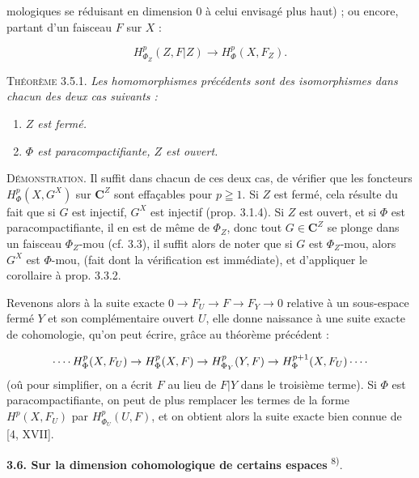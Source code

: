 
\noindent mologiques se réduisant en dimension 0 à celui envisagé plus haut) ;
ou encore, partant d'un faisceau $F$ sur $X$ :

\[
H^p_{\Phi_Z}(Z,F\vert Z)\to H^p_\Phi(X,F_Z).
\]

\indent\textsc{Théorème 3.5.1.} \textit{Les homomorphismes précédents
sont des isomorphismes dans chacun des deux cas suivants :}
\begin{enumerate}
\item \textit{$Z$ est fermé.}
\item \textit{$\Phi$ est paracompactifiante, $Z$ est ouvert.}
\end{enumerate}

\indent\textsc{Démonstration.} Il suffit dans chacun de ces deux cas, de
vérifier que les foncteurs $H^p_\Phi(X,G^X)$ sur $\mathbf C^Z$ sont effaçables pour
$p\geqq1$. Si $Z$ est fermé, cela résulte du fait que si $G$ est injectif,
$G^X$ est injectif (prop. 3.1.4). Si $Z$ est ouvert, et si $\Phi$ est
paracompactifiante, il en est de même de $\Phi_Z$, donc tout $G\in \mathbf C^Z$ se
plonge dans un faisceau $\Phi_Z$-mou (cf. 3.3), il suffit alors de noter que si
$G$ est $\Phi_Z$-mou, alors $G^X$ est $\Phi$-mou, (fait dont la vérification
est immédiate), et d'appliquer le corollaire à prop. 3.3.2.

Revenons alors à la suite exacte
$0\to F_U\to F\to F_Y\to0$
relative à un sous-espace fermé $Y$ et son complémentaire ouvert $U$, elle
donne naissance à une suite exacte de cohomologie, qu'on peut écrire, grâce au
théorème précédent :

\[
\mathinner{\cdotp\cdotp\cdotp\cdotp} H^p_\Phi(X,F_U)\to H^p_\Phi(X,F)
\to H^p_{\Phi_Y}(Y,F)\to
H^{p+1}_\Phi(X,F_U)\mathinner{\cdotp\cdotp\cdotp\cdotp}
\]
(oû pour simplifier, on a écrit $F$ au lieu de $F\vert Y$ dans le troisième
terme).
Si $\Phi$ est paracompactifiante, on peut de plus remplacer les termes de la
forme $H^p(X,F_U)$ par $H^p_{\Phi_U}(U,F)$, et on obtient alors la suite
exacte bien connue de [4, XVII].

\indent\textbf{3.6. Sur la dimension cohomologique de certains espaces}%
\textsuperscript{8)}.

